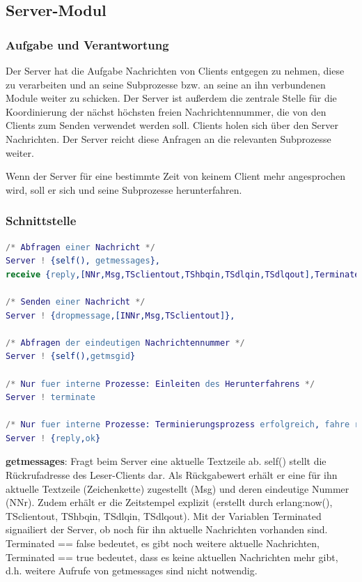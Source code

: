 \documentclass{article}
\begin{document}
\subsection{Server-Modul}
\subsubsection{Aufgabe und Verantwortung}
Der Server hat die Aufgabe Nachrichten von Clients entgegen zu nehmen, diese zu verarbeiten und an seine Subprozesse
bzw. an seine an ihn verbundenen Module weiter zu schicken. Der Server ist außerdem die zentrale Stelle für die
Koordinierung der nächst höchsten freien Nachrichtennummer, die von den Clients zum Senden verwendet werden soll.
Clients holen sich über den Server Nachrichten. Der Server reicht diese Anfragen an die relevanten Subprozesse weiter.

Wenn der Server für eine bestimmte Zeit von keinem Client mehr angesprochen wird, soll er sich und seine Subprozesse
herunterfahren.

\subsubsection{Schnittstelle}
\begin{lstlisting}[language=erlang]
/* Abfragen einer Nachricht */
Server ! {self(), getmessages},
receive {reply,[NNr,Msg,TSclientout,TShbqin,TSdlqin,TSdlqout],Terminated}

/* Senden einer Nachricht */
Server ! {dropmessage,[INNr,Msg,TSclientout]},

/* Abfragen der eindeutigen Nachrichtennummer */
Server ! {self(),getmsgid}

/* Nur fuer interne Prozesse: Einleiten des Herunterfahrens */
Server ! terminate

/* Nur fuer interne Prozesse: Terminierungsprozess erfolgreich, fahre runter*/
Server ! {reply,ok}
\end{lstlisting}

\textbf{getmessages}: Fragt beim Server eine aktuelle Textzeile ab. self() stellt die Rückrufadresse des Leser-Clients dar. Als Rückgabewert erhält er eine für ihn aktuelle Textzeile (Zeichenkette) zugestellt (Msg) und deren eindeutige Nummer (NNr).
Zudem erhält er die Zeitstempel explizit (erstellt durch erlang:now(), TSclientout, TShbqin, TSdlqin, TSdlqout).
Mit der Variablen Terminated signailiert der Server, ob noch für ihn aktuelle Nachrichten vorhanden sind. Terminated == false bedeutet, es gibt noch weitere aktuelle Nachrichten, Terminated == true bedeutet, dass es keine aktuellen Nachrichten mehr gibt, d.h. weitere Aufrufe von getmessages sind nicht notwendig.\\
\end{document}
